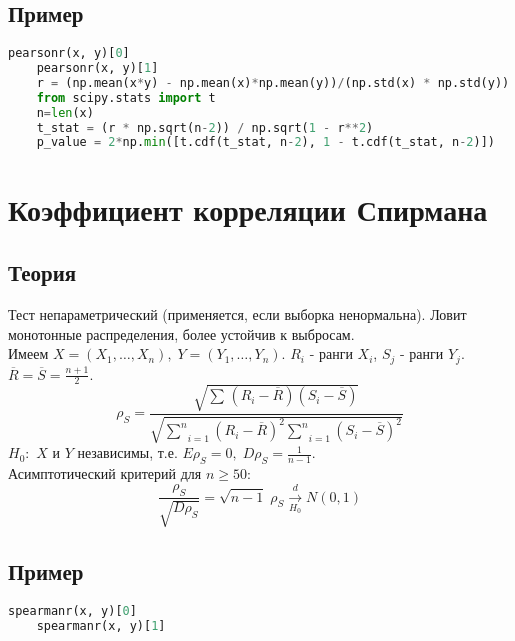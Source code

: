 \subsection*{Пример}\label{cha:corr/sec:pirson/subsec:prob}

\begin{lstlisting}[language=Python]
	pearsonr(x, y)[0]
	pearsonr(x, y)[1]
	r = (np.mean(x*y) - np.mean(x)*np.mean(y))/(np.std(x) * np.std(y))
	from scipy.stats import t
	n=len(x)
	t_stat = (r * np.sqrt(n-2)) / np.sqrt(1 - r**2)
	p_value = 2*np.min([t.cdf(t_stat, n-2), 1 - t.cdf(t_stat, n-2)])
\end{lstlisting}

\section{Коэффициент корреляции Спирмана}\label{cha:corr/sec:spearman}

\subsection*{Теория}\label{cha:corr/sec:spearman/subsec:theory}

Тест непараметрический (применяется, если выборка ненормальна). Ловит монотонные распределения, более устойчив к выбросам.\\

Имеем $X = (X_1, \dots, X_n), \; Y = (Y_1, \dots, Y_n)$. $R_i$ - ранги $X_i$, $S_j$ - ранги $Y_j$. $\overline{R} = \overline{S} = \frac{n+1}{2}$.
$$\rho_S = \frac{\sqrt{\underset{}{\overset{}{\sum}}(R_i - \overline{R})(S_i - \overline{S})}}{\sqrt{\underset{i=1}{\overset{n}{\sum}}(R_i - \overline{R})^2 \underset{i=1}{\overset{n}{\sum}}(S_i - \overline{S})^2}}$$
$H_0:$ $X$ и $Y$ независимы, т.е. $E \rho_S = 0, \; D \rho_S = \frac{1}{n-1}$.\\

Асимптотический критерий для $n \ge 50$:
$$\frac{\rho_S}{\sqrt{D \rho_S}} = \sqrt{n-1} \; \rho_S \xrightarrow[H_0]{d}N(0,1)$$

\subsection*{Пример}\label{cha:corr/sec:spearman/subsec:prob}

\begin{lstlisting}[language=Python]
	spearmanr(x, y)[0]
	spearmanr(x, y)[1]
\end{lstlisting}

